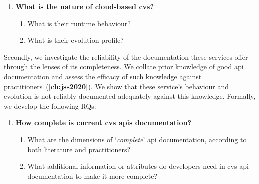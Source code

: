 \begin{leftbar}
\begin{enumerate}[label=\faQuestionCircle~~\textbf{RQ\arabic*.}, ref=RQ\arabic*, leftmargin=2.75\parindent, rightmargin=1\parindent]
    \item \textbf{What is the nature of cloud-based \gls{cvs}?}\label{rq:icsme}
    \begin{enumerate}[label=\textit{RQ1.\arabic*.}, ref=RQ1.\arabic*]
      \item What is their runtime behaviour?\label{rq:icsme:rq1}%
      \item What is their evolution profile?\label{rq:icsme:rq2}%
    \end{enumerate}
\end{enumerate}
\end{leftbar}

Secondly, we investigate the reliability of the documentation these services offer through the lenses of its completeness. We collate prior knowledge of good \gls{api} documentation and assess the efficacy of such knowledge against practitioners~(\textbf{\cref{ch:jss2020}}). We show that these service's behaviour and evolution is not reliably documented adequately against this knowledge. Formally, we develop the following RQs:

\begin{leftbar}
\begin{enumerate}[label=\faQuestionCircle~~\textbf{RQ\arabic*.}, ref=RQ\arabic*, leftmargin=2.75\parindent, rightmargin=1\parindent,start=2]
    \item \textbf{How complete is current \gls{cvs} \glspl{api} documentation?}\label{rq:esem}%
    \begin{enumerate}[label=\textit{RQ2.\arabic*.}, ref=RQ2.\arabic*]
      \item What are the dimensions of `\textit{complete}' \gls{api} documentation, according to both literature and practitioners?\label{rq:esem:rq1}%
      \item What additional information or attributes do developers need in \gls{cvs} \gls{api} documentation to make it more complete?\label{rq:esem:rq2}%
    \end{enumerate}
\end{enumerate}
\end{leftbar}

